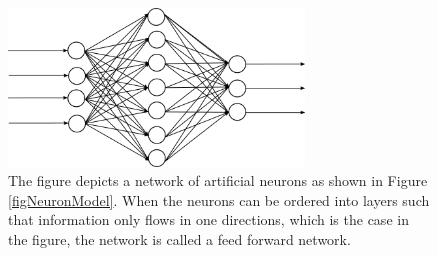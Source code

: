 \begin{figure}[h!]
  \centering
  \includegraphics[width=0.7\textwidth]{fig/feedforward.png}
  \caption[Feed forward artificial neural network]{
    The figure depicts a network of artificial neurons as shown in Figure
    \ref{figNeuronModel}.
    When the neurons can be ordered into layers such that information only flows
    in one directions, which is the case in the figure, the network is called a
    feed forward network.
  }
  \label{figFFANN}
\end{figure}
